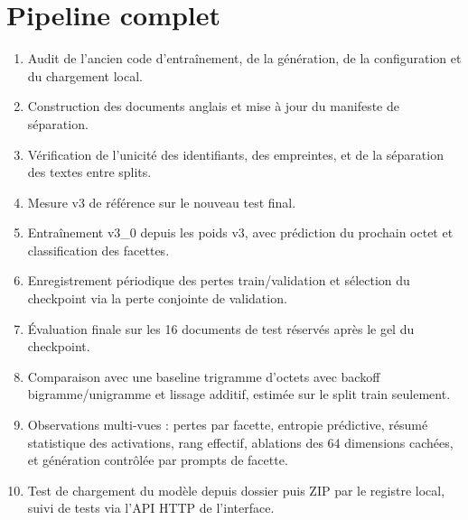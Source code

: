 \documentclass[11pt,a4paper]{article}
\begin{document}
\section{Pipeline complet}
\begin{enumerate}[leftmargin=*]
\item Audit de l'ancien code d'entraînement, de la génération, de la configuration et du chargement local.
\item Construction des documents anglais et mise à jour du manifeste de séparation.
\item Vérification de l'unicité des identifiants, des empreintes, et de la séparation des textes entre splits.
\item Mesure v3 de référence sur le nouveau test final.
\item Entraînement v3\_0 depuis les poids v3, avec prédiction du prochain octet et classification des facettes.
\item Enregistrement périodique des pertes train/validation et sélection du checkpoint via la perte conjointe de validation.
\item Évaluation finale sur les 16 documents de test réservés après le gel du checkpoint.
\item Comparaison avec une baseline trigramme d'octets avec backoff bigramme/unigramme et lissage additif, estimée sur le split train seulement.
\item Observations multi-vues : pertes par facette, entropie prédictive, résumé statistique des activations, rang effectif, ablations des 64 dimensions cachées, et génération contrôlée par prompts de facette.
\item Test de chargement du modèle depuis dossier puis ZIP par le registre local, suivi de tests via l'API HTTP de l'interface.
\end{enumerate}
\end{document}
